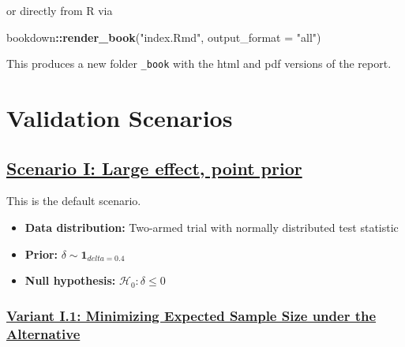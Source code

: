 \documentclass[]{book}
\newenvironment{Shaded}{\begin{snugshade}}{\end{snugshade}}
\newcommand{\DataTypeTok}[1]{\textcolor[rgb]{0.13,0.29,0.53}{#1}}
\newcommand{\KeywordTok}[1]{\textcolor[rgb]{0.13,0.29,0.53}{\textbf{#1}}}
\newcommand{\NormalTok}[1]{#1}
\newcommand{\OperatorTok}[1]{\textcolor[rgb]{0.81,0.36,0.00}{\textbf{#1}}}
\newcommand{\StringTok}[1]{\textcolor[rgb]{0.31,0.60,0.02}{#1}}
\providecommand{\tightlist}{%
  \setlength{\itemsep}{0pt}\setlength{\parskip}{0pt}}
\begin{document}
or directly from R via

\begin{Shaded}
\begin{Highlighting}[]
\NormalTok{bookdown}\OperatorTok{::}\KeywordTok{render_book}\NormalTok{(}\StringTok{"index.Rmd"}\NormalTok{, }\DataTypeTok{output_format =} \StringTok{"all"}\NormalTok{)}
\end{Highlighting}
\end{Shaded}

This produces a new folder \texttt{\_book} with the html and pdf versions
of the report.

\hypertarget{validation-scenarios}{%
\section{Validation Scenarios}\label{validation-scenarios}}

\hypertarget{scenario-i-large-effect-point-prior}{%
\subsection{\texorpdfstring{\protect\hyperlink{scenarioI}{Scenario I: Large effect, point prior}}{Scenario I: Large effect, point prior}}\label{scenario-i-large-effect-point-prior}}

This is the default scenario.

\begin{itemize}
\tightlist
\item
  \textbf{Data distribution:} Two-armed trial with normally distributed test statistic
\item
  \textbf{Prior:} \(\delta\sim\textbf{1}_{delta=0.4}\)
\item
  \textbf{Null hypothesis:} \(\mathcal{H}_0:\delta \leq 0\)
\end{itemize}

\hypertarget{variant-i.1-minimizing-expected-sample-size-under-the-alternative}{%
\subsubsection{\texorpdfstring{\protect\hyperlink{variantI_1}{Variant I.1: Minimizing Expected Sample Size under the Alternative}}{Variant I.1: Minimizing Expected Sample Size under the Alternative}}\label{variant-i.1-minimizing-expected-sample-size-under-the-alternative}}
\end{document}
